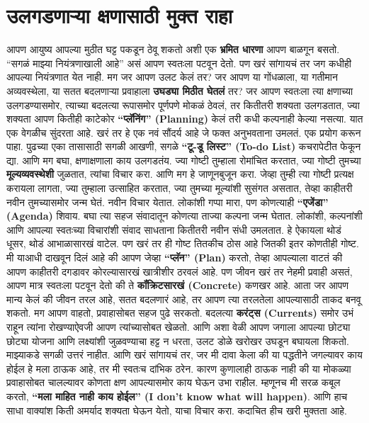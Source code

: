  \chapter{उलगडणाऱ्या क्षणासाठी मुक्त राहा}
आपण आयुष्य आपल्या मुठीत घट्ट पकडून ठेवू शकतो अशी एक \textbf{भ्रमित धारणा} आपण बाळगून बसतो. ``सगळं माझ्या नियंत्रणाखाली आहे'' असं आपण स्वतःला पटवून देतो. पण खरं सांगायचं तर जग कधीही आपल्या नियंत्रणात येत नाही. मग जर आपण उलट केलं तर? जर आपण या गोंधळाला, या गतीमान अव्यवस्थेला, या सतत बदलणाऱ्या प्रवाहाला \textbf{उघड्या मिठीत घेतलं} तर?
जर आपण स्वतःला त्या क्षणाच्या उलगडण्यासमोर, त्याच्या बदलत्या रूपासमोर पूर्णपणे मोकळं ठेवलं, तर कितीतरी शक्यता उलगडतात, ज्या शक्यता आपण कितीही काटेकोर \textbf{``प्लॅनिंग'' (Planning)} केलं तरी कधी कल्पनाही केल्या नसत्या.
यात एक वेगळीच सुंदरता आहे. खरं तर हे एक नवं सौंदर्य आहे जे फक्त अनुभवताना उमलतं.
एक प्रयोग करून पाहा. पुढच्या एका तासासाठी सगळी आखणी, सगळे \textbf{``टू-डू लिस्ट'' (To-do List)} कचरापेटीत फेकून द्या. आणि मग बघा, क्षणाक्षणाला काय उलगडतंय. ज्या गोष्टी तुम्हाला रोमांचित करतात, ज्या गोष्टी तुमच्या \textbf{मूल्यव्यवस्थेशी} जुळतात, त्यांचा विचार करा. आणि मग हे जाणूनबुजून करा.
जेव्हा तुम्ही त्या गोष्टी प्रत्यक्ष करायला लागता, ज्या तुम्हाला उत्साहित करतात, ज्या तुमच्या मूल्यांशी सुसंगत असतात, तेव्हा काहीतरी नवीन तुमच्यासमोर जन्म घेतं. नवीन विचार येतात. लोकांशी गप्पा मारा, पण कोणत्याही \textbf{``एजेंडा'' (Agenda)} शिवाय. बघा त्या सहज संवादातून कोणत्या ताज्या कल्पना जन्म घेतात. लोकांशी, कल्पनांशी आणि आपल्या स्वतःच्या विचारांशी संवाद साधताना कितीतरी नवीन संधी उमलतात.
हे ऐकायला थोडं धूसर, थोडं आभाळासारखं वाटेल. पण खरं तर ही गोष्ट तितकीच ठोस आहे जितकी इतर कोणतीही गोष्ट. मी याआधी दाखवून दिलं आहे की आपण जेव्हा \textbf{``प्लॅन'' (Plan)} करतो, तेव्हा आपल्याला वाटतं की आपण काहीतरी दगडावर कोरल्यासारखं खात्रीशीर ठरवलं आहे. पण जीवन खरं तर नेहमी प्रवाही असतं, आपण मात्र स्वतःला पटवून देतो की ते \textbf{कॉंक्रिटसारखं (Concrete)} कणखर आहे.
आता जर आपण मान्य केलं की जीवन तरल आहे, सतत बदलणारं आहे, तर आपण त्या तरलतेला आपल्यासाठी ताकद बनवू शकतो. मग आपण वाहतो, प्रवाहासोबत सहज पुढे सरकतो. बदलत्या \textbf{करंट्स (Currents)} समोर उभं राहून त्यांना रोखण्याऐवजी आपण त्यांच्यासोबत खेळतो. आणि अशा वेळी आपण जगाला आपल्या छोट्या छोट्या योजना आणि लक्ष्यांशी जुळवण्याचा हट्ट न धरता, उलट डोळे खरोखर उघडून बघायला शिकतो.
माझ्याकडे सगळी उत्तरं नाहीत. आणि खरं सांगायचं तर, जर मी दावा केला की या पद्धतीने जगल्यावर काय होईल हे मला ठाऊक आहे, तर मी स्वतःच दांभिक ठरेन. कारण कुणालाही ठाऊक नाही की या मोकळ्या प्रवाहासोबत चालल्यावर कोणता क्षण आपल्यासमोर काय घेऊन उभा राहील.
म्हणूनच मी सरळ कबूल करतो, \textbf{``मला माहित नाही काय होईल'' (I don't know what will happen)}. आणि हाच साधा वाक्यांश किती अमर्याद शक्यता घेऊन येतो, याचा विचार करा. कदाचित हीच खरी मुक्तता आहे.
